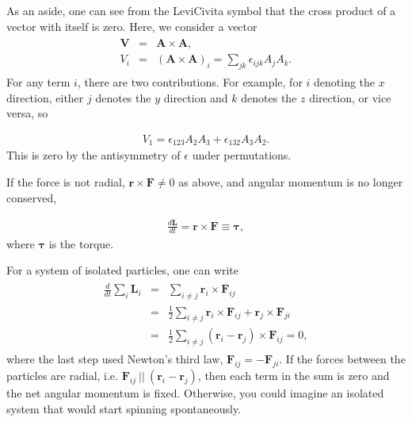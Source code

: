 \documentclass[letterpaper,10pt,english]{sphinxmanual}
\begin{document}
As an aside, one can see from the Levi\sphinxhyphen{}Civita symbol that the cross
product of a vector with itself is zero. Here, we consider a vector
\begin{equation*}
\begin{split}
\begin{eqnarray}
\boldsymbol{V}&=&\boldsymbol{A}\times\boldsymbol{A},\\
\nonumber
V_i&=&(\boldsymbol{A}\times\boldsymbol{A})_i=\sum_{jk}\epsilon_{ijk}A_jA_k.
\end{eqnarray}
\end{split}
\end{equation*}
For any term \(i\), there are two contributions. For example, for \(i\)
denoting the \(x\) direction, either \(j\) denotes the \(y\) direction and
\(k\) denotes the \(z\) direction, or vice versa, so




\begin{equation*}
\begin{split}
\begin{equation}
V_1=\epsilon_{123}A_2A_3+\epsilon_{132}A_3A_2.
\label{_auto32} \tag{35}
\end{equation}
\end{split}
\end{equation*}
This is zero by the antisymmetry of \(\epsilon\) under permutations.

If the force is not radial, \(\boldsymbol{r}\times\boldsymbol{F}\ne 0\) as above, and angular momentum is no longer conserved,




\begin{equation*}
\begin{split}
\begin{equation}
\frac{d\boldsymbol{L}}{dt}=\boldsymbol{r}\times\boldsymbol{F}\equiv\boldsymbol{\tau},
\label{_auto33} \tag{36}
\end{equation}
\end{split}
\end{equation*}
where \(\boldsymbol{\tau}\) is the torque.

For a system of isolated particles, one can write
\begin{equation*}
\begin{split}
\begin{eqnarray}
\frac{d}{dt}\sum_i\boldsymbol{L}_i&=&\sum_{i\ne j}\boldsymbol{r}_i\times \boldsymbol{F}_{ij}\\
\nonumber
&=&\frac{1}{2}\sum_{i\ne j} \boldsymbol{r}_i\times \boldsymbol{F}_{ij}+\boldsymbol{r}_j\times\boldsymbol{F}_{ji}\\
\nonumber
&=&\frac{1}{2}\sum_{i\ne j} (\boldsymbol{r}_i-\boldsymbol{r}_j)\times\boldsymbol{F}_{ij}=0,
\end{eqnarray}
\end{split}
\end{equation*}
where the last step used Newton’s third law,
\(\boldsymbol{F}_{ij}=-\boldsymbol{F}_{ji}\). If the forces between the particles are
radial, i.e. \(\boldsymbol{F}_{ij} ~||~ (\boldsymbol{r}_i-\boldsymbol{r}_j)\), then each term in
the sum is zero and the net angular momentum is fixed. Otherwise, you
could imagine an isolated system that would start spinning
spontaneously.
\end{document}
